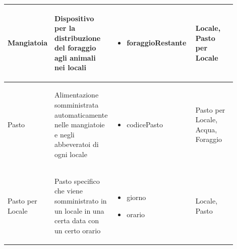 \documentclass[12pt,a4paper]{article}
\begin{document}
\begin{center}
\begin{longtable}{|p{0.14\linewidth}|p{0.20\linewidth}|p{0.36\linewidth}|p{0.20\linewidth}|}
\hline
Mangiatoia 		& \begin{flushleft}\vspace{-25pt} Dispositivo per la distribuzione del foraggio agli animali nei locali \end{flushleft}
					& \begin{itemize}
						\setlength{\itemindent}{-1em}
						\vspace{-25pt}
						\setlength\itemsep{-0.25em}
						\item foraggioRestante
						
						
						
					\end{itemize}
					& \begin{flushleft}\vspace{-25pt} Locale, Pasto per Locale\end{flushleft}\\

\hline
Pasto 				& \begin{flushleft}\vspace{-25pt} Alimentazione somministrata automaticamente nelle mangiatoie e negli abbeveratoi di ogni locale \end{flushleft}
					& \begin{itemize}
						\setlength{\itemindent}{-1em}
						\vspace{-25pt}
						\setlength\itemsep{-0.25em}
						\item codicePasto
						
						
						
						
					\end{itemize}
					& \begin{flushleft}\vspace{-25pt} Pasto per Locale, Acqua, Foraggio \end{flushleft}\\

\hline
Pasto per Locale 				& \begin{flushleft}\vspace{-25pt} Pasto specifico che viene somministrato in un locale in una certa data con un certo orario \end{flushleft}
					& \begin{itemize}
						\setlength{\itemindent}{-1em}
						\vspace{-25pt}
						\setlength\itemsep{-0.25em}
						\item giorno
						\item orario
					\end{itemize}
					& \begin{flushleft}\vspace{-25pt} Locale, Pasto \end{flushleft}\\


\end{longtable}
\end{center}
\end{document}
